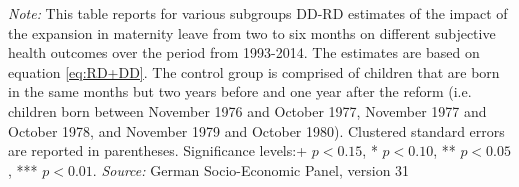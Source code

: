 \documentclass[a4paper ]{article}
\newlength\FHoffset
\begin{document}
\begin{table}[p] \centering
\def\sym#1{\ifmmode^{#1}\else\(^{#1}\)\fi}
\caption{Heterogenity Analysis for Subjective Health Outcomes, DD-RD Estimates}\label{tab:Heterog_SH}
\begin{minipage}{0.98\textwidth} %
{\footnotesize \textit{Note:} This table reports for various subgroups DD-RD estimates of the impact of the expansion in maternity leave from two to six months on different subjective health outcomes over the period from 1993-2014. The estimates are based on equation \ref{eq:RD+DD}. The control group is comprised of children that are born in the same months but two years before and one year after the reform (i.e. children born between November 1976 and October 1977, November 1977 and October 1978, and November 1979 and October 1980).\newline
Clustered standard errors are reported in parentheses. Significance levels:+ \(p<0.15\), * \(p<0.10\), ** \(p<0.05\), *** \(p<0.01\). \newline \textit{Source: }German Socio-Economic Panel, version 31\par}
\end{minipage}
\end{table}
\restoregeometry

\newpage
{}	
	\setlength\FHoffset{-2.5cm} 
		\fancyheadoffset{\FHoffset}
\end{document}
